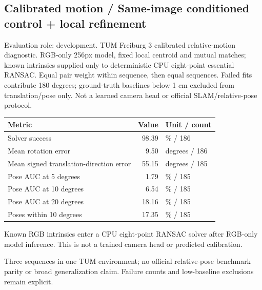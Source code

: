 \documentclass[10pt]{article}
\begin{document}
\subsection{Calibrated motion / Same-image conditioned control + local refinement}
Evaluation role: development. TUM Freiburg 3 calibrated relative-motion diagnostic. RGB-only 256px model, fixed local centroid and mutual matches; known intrinsics supplied only to deterministic CPU eight-point essential RANSAC. Equal pair weight within sequence, then equal sequences. Failed fits contribute 180 degrees; ground-truth baselines below 1 cm excluded from translation/pose only. Not a learned camera head or official SLAM/relative-pose protocol.
\begin{center}\begin{tabular}{p{.57\linewidth}rp{.23\linewidth}}\toprule Metric & Value & Unit / count \\ \midrule
Solver success & 98.39 & \% / 186 \\
Mean rotation error & 9.50 & degrees / 186 \\
Mean signed translation-direction error & 55.15 & degrees / 185 \\
Pose AUC at 5 degrees & 1.79 & \% / 185 \\
Pose AUC at 10 degrees & 6.54 & \% / 185 \\
Pose AUC at 20 degrees & 18.16 & \% / 185 \\
Poses within 10 degrees & 17.35 & \% / 185 \\
\bottomrule\end{tabular}\end{center}
Known RGB intrinsics enter a CPU eight-point RANSAC solver after RGB-only model inference. This is not a trained camera head or predicted calibration.

Three sequences in one TUM environment; no official relative-pose benchmark parity or broad generalization claim. Failure counts and low-baseline exclusions remain explicit.
\end{document}
